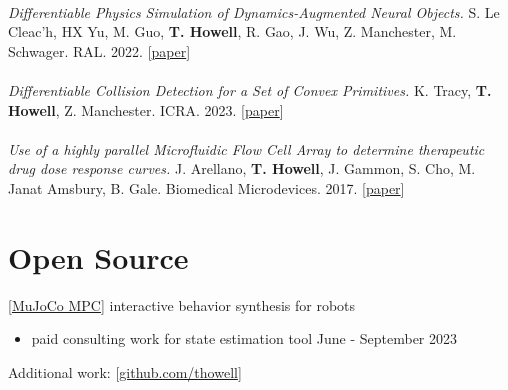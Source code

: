 \documentclass[10pt]{article}
\begin{document}
\\
\textit{Differentiable Physics Simulation of Dynamics-Augmented Neural Objects.}{\color{lightgray} S. Le Cleac'h, HX Yu, M. Guo, }\textbf{T. Howell}{\color{lightgray}, R. Gao, J. Wu, Z. Manchester, M. Schwager. RAL. 2022.}
[\href{https://arxiv.org/pdf/2210.09420.pdf}{paper}]
\\
\\
\textit{Differentiable Collision Detection for a Set of Convex Primitives.} {\color{lightgray} K. Tracy,} \textbf{T. Howell}{\color{lightgray}, Z. Manchester. ICRA. 2023.}
[\href{https://arxiv.org/abs/2207.00669}{paper}]
\\
\\
\textit{Use of a highly parallel Microfluidic Flow Cell Array to determine therapeutic drug dose response curves.} {\color{lightgray} J. Arellano, }\textbf{T. Howell}{\color{lightgray}, J. Gammon, S. Cho, M. Janat Amsbury, B. Gale. Biomedical Microdevices. 2017.}
[\href{https://link.springer.com/article/10.1007/s10544-017-0166-3}{paper}]

\section*{Open Source}

[\href{https://github.com/deepmind/mujoco_mpc}{MuJoCo MPC}] {\color{lightgray} interactive behavior synthesis for robots}
\begin{itemize}
    \item {\color{lightgray} paid consulting work for state estimation tool \hfill June - September 2023}
\end{itemize}




\noindent Additional work: [\href{https://github.com/thowell}{github.com/thowell}]
\end{document}

